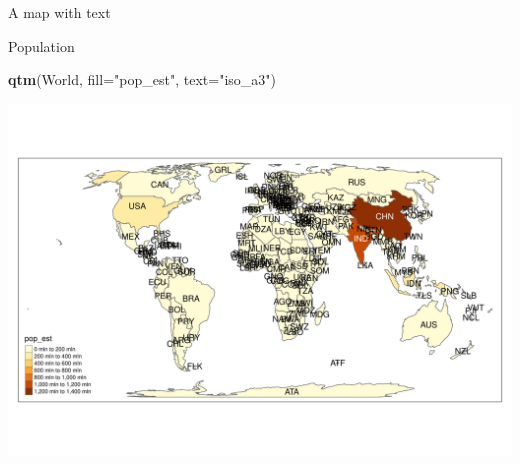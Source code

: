 \documentclass[
  ignorenonframetext,
]{beamer}
\newenvironment{Shaded}{\begin{snugshade}}{\end{snugshade}}
\newcommand{\DataTypeTok}[1]{\textcolor[rgb]{0.13,0.29,0.53}{#1}}
\newcommand{\KeywordTok}[1]{\textcolor[rgb]{0.13,0.29,0.53}{\textbf{#1}}}
\newcommand{\NormalTok}[1]{#1}
\newcommand{\StringTok}[1]{\textcolor[rgb]{0.31,0.60,0.02}{#1}}
\begin{document}
\begin{frame}[fragile]{A map with text}
\protect\hypertarget{a-map-with-text}{}
\begin{block}{Population}
\protect\hypertarget{population}{}
\begin{Shaded}
\begin{Highlighting}[]
\KeywordTok{qtm}\NormalTok{(World, }\DataTypeTok{fill=}\StringTok{"pop\_est"}\NormalTok{, }\DataTypeTok{text=}\StringTok{"iso\_a3"}\NormalTok{)}
\end{Highlighting}
\end{Shaded}

\includegraphics{quick_high_quality_maps_files/figure-beamer/unnamed-chunk-5-1.pdf}
\end{block}
\end{frame}
\end{document}
